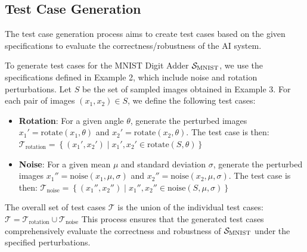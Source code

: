 \documentclass[10pt, conference, a4paper, final]{IEEEtran}
\begin{document}
  \subsection{Test Case Generation}
  The test case generation process aims to create test cases based on the given specifications to evaluate the correctness/robustness of the AI system.
  \begin{example}
    To generate test cases for the MNIST Digit Adder $\S_{\text{MNIST}}$, we use the specifications defined in Example 2, which include noise and rotation perturbations. Let $S$ be the set of sampled images obtained in Example 3. For each pair of images $(x_1, x_2) \in S$, we define the following test cases:
    \begin{itemize}
        \item \textbf{Rotation}: For a given angle $\theta$, generate the perturbed images $x_1' = \text{rotate}(x_1, \theta)$ and $x_2' = \text{rotate}(x_2, \theta)$. The test case is then:
        $\mathcal{T}_{\text{rotation}} = \left\{(x_1', x_2') \mid x_1', x_2' \in \text{rotate}(S, \theta)\right\}$
        \item \textbf{Noise}: For a given mean $\mu$ and standard deviation $\sigma$, generate the perturbed images $x_1'' = \text{noise}(x_1, \mu, \sigma)$ and $x_2'' = \text{noise}(x_2, \mu, \sigma)$. The test case is then:
        $\mathcal{T}_{\text{noise}} = \left\{(x_1'', x_2'') \mid x_1'', x_2'' \in \text{noise}(S, \mu, \sigma)\right\}$
    \end{itemize}
    The overall set of test cases $\mathcal{T}$ is the union of the individual test cases:
    $\mathcal{T} = \mathcal{T}_{\text{rotation}} \cup \mathcal{T}_{\text{noise}}$
    This process ensures that the generated test cases comprehensively evaluate the correctness and robustness of $\S_{\text{MNIST}}$ under the specified perturbations.
\end{example}

\end{document}
